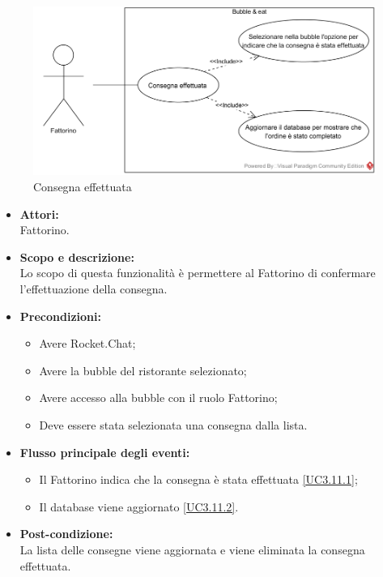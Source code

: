 
\begin{figure}[H]
	\centering
	\includegraphics[width=15cm]{../../documenti/AnalisiDeiRequisiti/Diagrammi_img/uc3_11.png}
	\caption{\UCCaption{} Consegna effettuata}
\end{figure}

\begin{itemize}
	\item \textbf{Attori:}
	\\Fattorino.
	\item \textbf{Scopo e descrizione:} 
	\\Lo scopo di questa funzionalità è permettere al Fattorino di confermare l'effettuazione della consegna.
	\item \textbf{Precondizioni:}
	\begin{itemize}
		\item Avere Rocket.Chat;
		\item Avere la bubble del ristorante selezionato;
		\item Avere accesso alla bubble con il ruolo Fattorino;
		\item Deve essere stata selezionata una consegna dalla lista.
	\end{itemize}
	\item \textbf{Flusso principale degli eventi:}
	\begin{itemize}
		\item Il Fattorino indica che la consegna è stata effettuata \ref{UC3.11.1};
		\item Il database viene aggiornato \ref{UC3.11.2}.
	\end{itemize}
	\item \textbf{Post-condizione:}
	\\La lista delle consegne viene aggiornata e viene eliminata la consegna effettuata.
\end{itemize}

